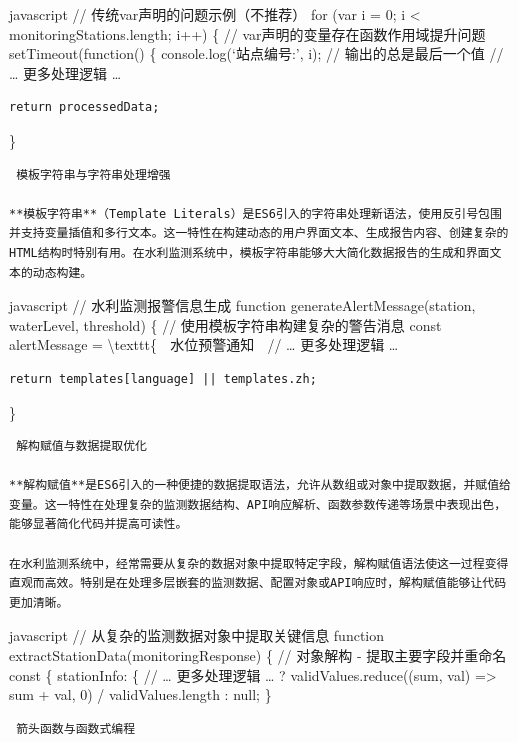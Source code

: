 {{javascript // 传统var声明的问题示例（不推荐） for (var i = 0; i \textless{} monitoringStations.length; i++) \{ // var声明的变量存在函数作用域提升问题 setTimeout(function() \{ console.log(`站点编号:', i); // 输出的总是最后一个值 // \ldots{} 更多处理逻辑 \ldots{}

\begin{verbatim}
return processedData;
\end{verbatim}

\}

\begin{lstlisting}
 模板字符串与字符串处理增强

**模板字符串**（Template Literals）是ES6引入的字符串处理新语法，使用反引号包围并支持变量插值和多行文本。这一特性在构建动态的用户界面文本、生成报告内容、创建复杂的HTML结构时特别有用。在水利监测系统中，模板字符串能够大大简化数据报告的生成和界面文本的动态构建。
\end{lstlisting}

javascript // 水利监测报警信息生成 function generateAlertMessage(station, waterLevel, threshold) \{ // 使用模板字符串构建复杂的警告消息 const alertMessage = \textbackslash texttt\{ 🚨 水位预警通知 🚨 // \ldots{} 更多处理逻辑 \ldots{}

\begin{verbatim}
return templates[language] || templates.zh;
\end{verbatim}

\}

\begin{lstlisting}
 解构赋值与数据提取优化

**解构赋值**是ES6引入的一种便捷的数据提取语法，允许从数组或对象中提取数据，并赋值给变量。这一特性在处理复杂的监测数据结构、API响应解析、函数参数传递等场景中表现出色，能够显著简化代码并提高可读性。

在水利监测系统中，经常需要从复杂的数据对象中提取特定字段，解构赋值语法使这一过程变得直观而高效。特别是在处理多层嵌套的监测数据、配置对象或API响应时，解构赋值能够让代码更加清晰。
\end{lstlisting}

javascript // 从复杂的监测数据对象中提取关键信息 function extractStationData(monitoringResponse) \{ // 对象解构 - 提取主要字段并重命名 const \{ stationInfo: \{ // \ldots{} 更多处理逻辑 \ldots{} ? validValues.reduce((sum, val) =\textgreater{} sum + val, 0) / validValues.length : null; \}

\begin{lstlisting}
 箭头函数与函数式编程


\end{lstlisting}}}
